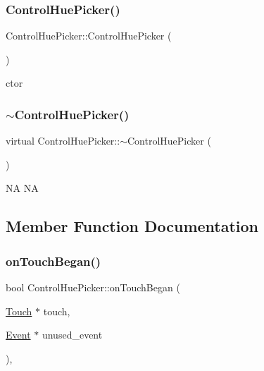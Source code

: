 \subsubsection{\texorpdfstring{Control\+Hue\+Picker()}{ControlHuePicker()}\hspace{0.1cm}{\footnotesize\ttfamily [2/2]}}
{\footnotesize\ttfamily Control\+Hue\+Picker\+::\+Control\+Hue\+Picker (\begin{DoxyParamCaption}{ }\end{DoxyParamCaption})}

ctor \mbox{\label{classControlHuePicker_ac78165c25c1618abef6eaad137f53376}} 
\subsubsection{\texorpdfstring{$\sim$\+Control\+Hue\+Picker()}{~ControlHuePicker()}\hspace{0.1cm}{\footnotesize\ttfamily [2/2]}}
{\footnotesize\ttfamily virtual Control\+Hue\+Picker\+::$\sim$\+Control\+Hue\+Picker (\begin{DoxyParamCaption}{ }\end{DoxyParamCaption})\hspace{0.3cm}{\ttfamily [virtual]}}

NA  NA 

\subsection{Member Function Documentation}
\mbox{\label{classControlHuePicker_ae14f5994e10b93bec6b4de027902b2a1}} 
\subsubsection{\texorpdfstring{on\+Touch\+Began()}{onTouchBegan()}\hspace{0.1cm}{\footnotesize\ttfamily [1/2]}}
{\footnotesize\ttfamily bool Control\+Hue\+Picker\+::on\+Touch\+Began (\begin{DoxyParamCaption}\item[{\hyperlink{classTouch}{Touch} $\ast$}]{touch,  }\item[{\hyperlink{classEvent}{Event} $\ast$}]{unused\+\_\+event }\end{DoxyParamCaption})\hspace{0.3cm}{\ttfamily [override]}, {\ttfamily [virtual]}}




